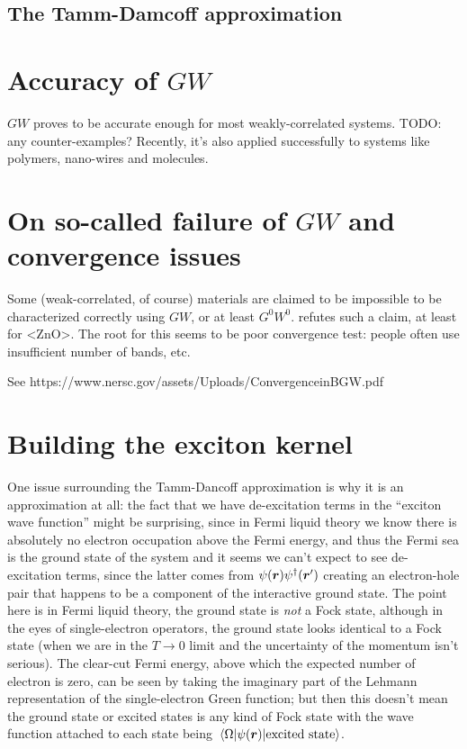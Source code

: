 \documentclass[hyperref, a4paper, 12pt]{report}
\def\ce#1{<#1>}%
\begin{document}
\subsection{The Tamm-Damcoff approximation}



\section{Accuracy of $GW$}


$GW$ proves to be accurate enough for most weakly-correlated systems.
TODO: any counter-examples?
Recently, it's also applied successfully to systems like polymers, nano-wires and molecules.

\section{On so-called failure of $GW$ and convergence issues}

Some (weak-correlated, of course) materials are claimed to be impossible 
to be characterized correctly using $GW$,
or at least $G^0 W^0$.
\cite{shih2010quasiparticle} refutes such a claim, 
at least for \ce{ZnO}.
The root for this seems to be poor convergence test:
people often use insufficient number of bands, etc.

See https://www.nersc.gov/assets/Uploads/ConvergenceinBGW.pdf

\section{Building the exciton kernel}

One issue surrounding the Tamm-Dancoff approximation 
is why it is an approximation at all:
the fact that we have de-excitation terms in the ``exciton wave function'' 
might be surprising, since in Fermi liquid theory 
we know there is absolutely no electron occupation 
above the Fermi energy, 
and thus the Fermi sea is the ground state of the system 
and it seems we can't expect to see de-excitation terms, 
since the latter comes from $\psi(\vb*{r}) \psi^\dagger(\vb*{r}')$
creating an electron-hole pair that 
happens to be a component of the interactive ground state. 
The point here is in Fermi liquid theory, 
the ground state is \emph{not} a Fock state, 
although in the eyes of single-electron operators, 
the ground state looks identical to a Fock state
(when we are in the $T \to 0$ limit 
and the uncertainty of the momentum isn't serious). 
The clear-cut Fermi energy, 
above which the expected number of electron is zero, 
can be seen by taking the imaginary part of the Lehmann representation 
of the single-electron Green function; 
but then this doesn't mean the ground state 
or excited states
is any kind of Fock state with the wave function 
attached to each state being $\mel{\Omega}{\psi(\vb*{r})}{\text{excited state}}$.
\end{document}
